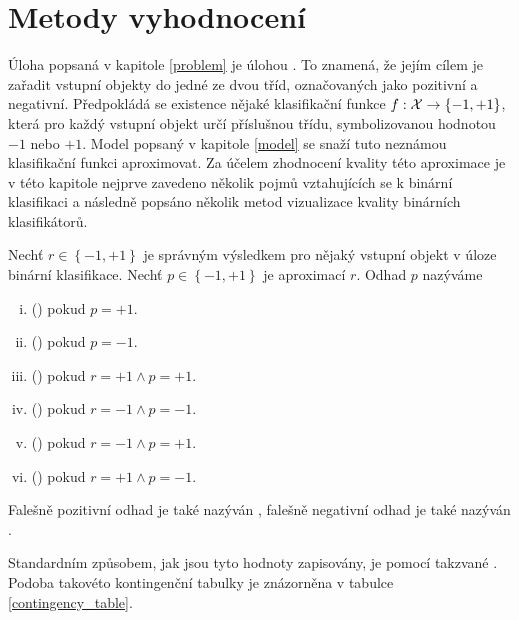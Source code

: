 \chapter{Metody vyhodnocení}

Úloha popsaná v kapitole \ref{problem} je úlohou . To znamená, že jejím cílem je zařadit vstupní objekty do jedné ze dvou tříd, označovaných jako pozitivní a negativní. Předpokládá se existence nějaké klasifikační funkce \( f : \mathcal X \to \left\{ -1, +1 \right\} \), která pro každý vstupní objekt určí příslušnou třídu, symbolizovanou hodnotou \( -1 \) nebo \( +1 \). Model popsaný v kapitole \ref{model} se snaží tuto neznámou klasifikační funkci aproximovat. Za účelem zhodnocení kvality této aproximace je v této kapitole nejprve zavedeno několik pojmů vztahujících se k binární klasifikaci a následně popsáno několik metod vizualizace kvality binárních klasifikátorů.

\begin{define}
	Nechť \( r \in \left\{ -1, +1 \right\} \) je správným výsledkem pro nějaký vstupní objekt v úloze binární klasifikace. Nechť \( p \in \left\{ -1, +1 \right\} \) je aproximací \( r \). Odhad \( p \) nazýváme
	\begin{enumerate}[i.]
		\item {} () pokud \( p = +1 \).
		\item {} () pokud \( p = -1 \).
		\item {} () pokud \( r = +1 \land p = +1 \).
		\item {} () pokud \( r = -1 \land p = -1 \).
		\item {} () pokud \( r = -1 \land p = +1 \).
		\item {} () pokud \( r = +1 \land p = -1 \).
	\end{enumerate}
	Falešně pozitivní odhad je také nazýván , falešně negativní odhad je také nazýván .
\end{define}

Standardním způsobem, jak jsou tyto hodnoty zapisovány, je pomocí takzvané . Podoba takovéto kontingenční tabulky je znázorněna v tabulce \ref{contingency_table}.

